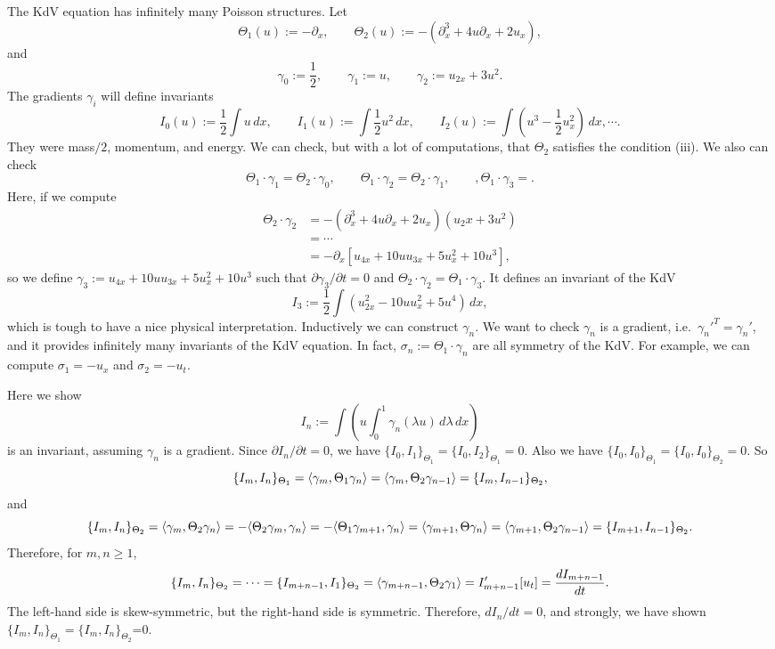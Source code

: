 \documentclass{../../../small}
\begin{document}
The KdV equation has infinitely many Poisson structures.
Let
\[\Theta_1(u):=-\partial_x,\qquad\Theta_2(u):=-(\partial_x^3+4u\partial_x+2u_x),\]
and
\[\gamma_0:=\frac12,\qquad\gamma_1:=u,\qquad\gamma_2:=u_{2x}+3u^2.\]
The gradients $\gamma_i$ will define invariants
\[I_0(u):=\frac12\int u\,dx,\qquad I_1(u):=\int\frac12u^2\,dx,\qquad I_2(u):=\int(u^3-\frac12u_x^2)\,dx,\cdots.\]
They were mass$/2$, momentum, and energy.
We can check, but with a lot of computations, that $\Theta_2$ satisfies the condition (iii).
We also can check
\[\Theta_1\cdot\gamma_1=\Theta_2\cdot\gamma_0,\qquad\Theta_1\cdot\gamma_2=\Theta_2\cdot\gamma_1,\qquad,\Theta_1\cdot\gamma_3=.\]
Here, if we compute
\begin{align*}
\Theta_2\cdot\gamma_2&=-(\partial_x^3+4u\partial_x+2u_x)(u_2x+3u^2)\\
&=\cdots\\
&=-\partial_x[u_{4x}+10uu_{3x}+5u_x^2+10u^3],
\end{align*}
so we define $\gamma_3:=u_{4x}+10uu_{3x}+5u_x^2+10u^3$ such that $\partial\gamma_3/\partial t=0$ and $\Theta_2\cdot\gamma_2=\Theta_1\cdot\gamma_3$.
It defines an invariant of the KdV
\[I_3:=\frac12\int(u_{2x}^2-10uu_x^2+5u^4)\,dx,\]
which is tough to have a nice physical interpretation.
Inductively we can construct $\gamma_n$.
We want to check $\gamma_n$ is a gradient, i.e.~$\gamma_n'^T=\gamma_n'$, and it provides infinitely many invariants of the KdV equation.
In fact, $\sigma_n:=\Theta_1\cdot\gamma_n$ are all symmetry of the KdV.
For example, we can compute $\sigma_1=-u_x$ and $\sigma_2=-u_t$.

Here we show
\[I_n:=\int(u\int_0^1\gamma_n(\lambda u)\,d\lambda\,dx)\]
is an invariant, assuming $\gamma_n$ is a gradient.
Since $\partial I_n/\partial t=0$, we have $\{I_0,I_1\}_{\Theta_1}=\{I_0,I_2\}_{\Theta_1}=0$.
Also we have $\{I_0,I_0\}_{\Theta_1}=\{I_0,I_0\}_{\Theta_2}=0$.
So
\[\{I_m,I_n\}_{\Theta_1}=\langle\gamma_m,\Theta_1\gamma_n\rangle=\langle\gamma_m,\Theta_2\gamma_{n-1}\rangle=\{I_m,I_{n-1}\}_{\Theta_2},\]
and
\[\{I_m,I_n\}_{\Theta_2}=\langle\gamma_m,\Theta_2\gamma_n\rangle=-\langle\Theta_2\gamma_m,\gamma_n\rangle=-\langle\Theta_1\gamma_{m+1},\gamma_n\rangle=\langle\gamma_{m+1},\Theta\gamma_n\rangle=\langle\gamma_{m+1},\Theta_2\gamma_{n-1}\rangle=\{I_{m+1},I_{n-1}\}_{\Theta_2}.\]
Therefore, for $m,n\ge1$,
\[\{I_m,I_n\}_{\Theta_2}=\cdots=\{I_{m+n-1},I_1\}_{\Theta_2}=\langle\gamma_{m+n-1},\Theta_2\gamma_1\rangle=I'_{m+n-1}[u_t]=\frac{dI_{m+n-1}}{dt}.\]
The left-hand side is skew-symmetric, but the right-hand side is symmetric.
Therefore, $dI_n/dt=0$, and strongly, we have shown $\{I_m,I_n\}_{\Theta_1}=\{I_m,I_n\}_{\Theta_2}$=0.
\end{document}
